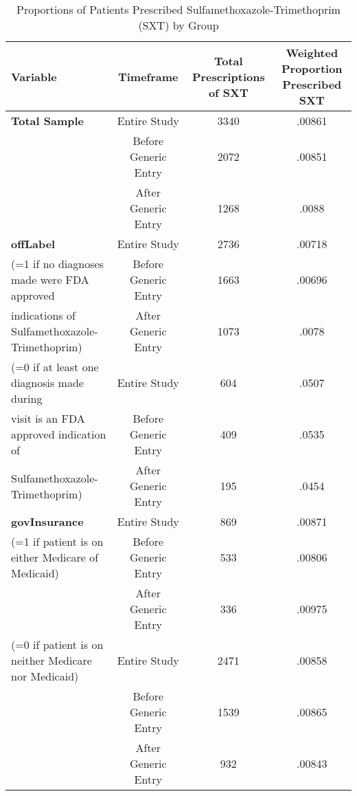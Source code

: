 \begin{table}[htbp]\centering
\def\sym#1{\ifmmode^{#1}\else\(^{#1}\)\fi}
\caption{Proportions of Patients Prescribed Sulfamethoxazole-Trimethoprim (SXT) by Group\label{tab1}}
\begin{tabular}{l*{3}{c}}
\hline\hline
            Variable&\multicolumn{1}{c}{Timeframe}&\multicolumn{1}{c}{Total Prescriptions of SXT}&\multicolumn{1}{c}{Weighted Proportion Prescribed SXT}\\
\hline
\textbf{Total Sample}                                   &     Entire Study&             3340&     .00861\\
                                                        &     Before Generic Entry&    2072&     .00851\\
                                                        &     After Generic Entry&      1268&     .0088\\
[1em]
\textbf{offLabel}                                       &     Entire Study&             2736&     .00718\\
(=1 if no diagnoses made were FDA approved         &     Before Generic Entry&    1663&     .00696\\
indications of Sulfamethoxazole-Trimethoprim)  &     After Generic Entry&      1073&     .0078\\
[1em]
(=0 if at least one diagnosis made during               &     Entire Study&             604&     .0507\\
visit is an FDA approved indication of                  &     Before Generic Entry&    409&     .0535\\
Sulfamethoxazole-Trimethoprim)                          &     After Generic Entry&      195&     .0454\\
[1em]
\textbf{govInsurance}                                   &     Entire Study&             869&     .00871\\
(=1 if patient is on either Medicare of Medicaid)       &     Before Generic Entry&     533 &     .00806\\
                                                        &     After Generic Entry&      336 &     .00975\\
[1em]
(=0 if patient is on neither Medicare nor Medicaid)     &     Entire Study&             2471&     .00858\\
                                                        &     Before Generic Entry&     1539 &     .00865\\
                                                        &     After Generic Entry&      932 &     .00843\\

\end{tabular}
\end{table}
